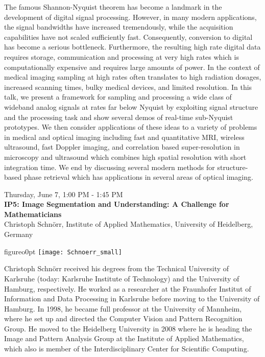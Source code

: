 The famous Shannon-Nyquist theorem has become a landmark in the development of digital signal processing. However, in many modern applications, the signal bandwidths have increased tremendously, while the acquisition capabilities have not scaled sufficiently fast. Consequently, conversion to digital has become a serious bottleneck. Furthermore, the resulting high rate digital data requires storage, communication and processing at very high rates which is computationally expensive and requires large amounts of power. In the context of medical imaging sampling at high rates often translates to high radiation dosages, increased scanning times, bulky medical devices, and limited resolution. In this talk, we present a framework for sampling and processing a wide class of wideband analog signals at rates far below Nyquist by exploiting signal structure and the processing task and show several demos of real-time sub-Nyquist prototypes. We then consider applications of these ideas to a variety of problems in medical and optical imaging including fast and quantitative MRI, wireless ultrasound, fast Doppler imaging, and correlation based super-resolution in microscopy and ultrasound which combines high spatial resolution with short integration time. We end by discussing several modern methods for structure-based phase retrieval which has applications in several areas of optical imaging.



\newpage\vspace{2cm}
\begin{center}{\Large{
Thursday, June 7, 1:00 PM - 1:45 PM \\
\textbf{IP5: Image Segmentation and Understanding: A Challenge for Mathematicians}\\
Christoph Schn\"{o}rr, Institute of Applied Mathematics, University of Heidelberg, Germany}}
\end{center}
\vspace{1cm}

\begin{wrapfloat}{figure}{o}{0pt}
\texttt{[image: Schnoerr\_small]}
\end{wrapfloat}
Christoph Schn\"{o}rr received his degrees from the Technical University of Karlsruhe (today: Karlsruhe Institute of Technology) and the University of Hamburg, respectively. He worked as a researcher at the Fraunhofer Institut of Information and Data Processing in Karlsruhe before moving to the University of Hamburg. In 1998, he became full professor at the University of Mannheim, where he set up and directed the Computer Vision and Pattern Recognition Group. He moved to the Heidelberg University in 2008 where he is heading the Image and Pattern Analysis Group at the Institute of Applied Mathematics, which also is member of the Interdisciplinary Center for Scientific Computing.

